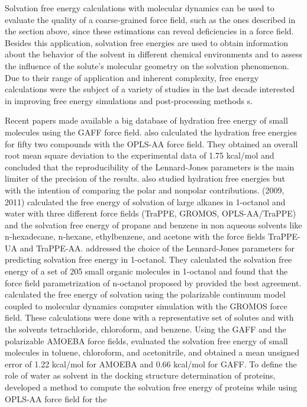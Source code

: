 Solvation free energy calculations with molecular dynamics can be used to evaluate the quality of a coarse-grained force field, such as the ones described in the section above, since these estimations can reveal deficiencies in a force field. Besides this application, solvation free energies are used to obtain information about the behavior of the solvent in different chemical environments and to assess the influence of the solute's molecular geometry on the solvation phenomenon. Due to their range of application and inherent complexity, free energy calculations were the subject of a variety of studies in the last decade interested in improving free energy simulations and post-processing methods \cite{mbar,bareva,dexp,gdel}s.

Recent papers \cite{PMID:24928188,mobley2017} made available a big database of hydration free energy of small molecules using the GAFF force field.  also calculated the hydration free energies for fifty two compounds with the OPLS-AA force field. They obtained an overall root mean square deviation to the experimental data of 1.75 kcal/mol and concluded that the reproducibility of the Lennard-Jones parameters is the main limiter of the precision of the results.  also studied hydration free energies but with the intention of comparing the polar and nonpolar contributions. \citeauthor{garrido2011} (2009, 2011) calculated the free energy of solvation of large alkanes in 1-octanol and water with three different force fields (TraPPE, GROMOS, OPLS-AA/TraPPE) and the solvation free energy of propane and benzene in non aqueous solvents like n-hexadecane, n-hexane, ethylbenzene, and acetone  with the force fields TraPPE-UA and TraPPE-AA.  addressed the choice of the Lennard-Jones parameters for predicting solvation free energy in 1-octanol. They calculated the solvation free energy of a set of 205 small organic molecules in 1-octanol and found that the force field parametrization of n-octanol proposed by  provided the best agreement.  calculated the free energy of solvation using the polarizable continuum model coupled to molecular dynamics computer simulation with the GROMOS force field. These calculations were done with a representative set of solutes and with the solvents tetrachloride, chloroform, and benzene. Using the GAFF and the polarizable AMOEBA force fields,  evaluated the solvation free energy of small molecules in toluene, chloroform, and acetonitrile, and obtained a mean unsigned error of 1.22 kcal/mol for AMOEBA and 0.66 kcal/mol for GAFF. To define the role of water as solvent in the docking structure determination of proteins,  developed a method to compute the solvation free energy of proteins while using OPLS-AA force field for the
